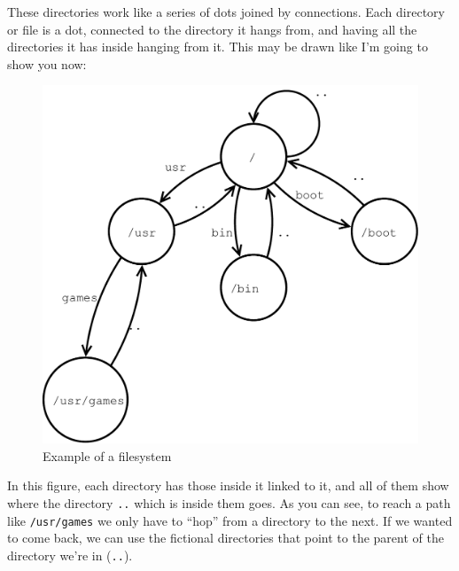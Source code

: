 \documentclass[a4paper]{article}
\begin{document}
These directories work like a series of dots joined by connections. Each
directory or file is a dot, connected to the directory it hangs from, and
having all the directories it has inside hanging from it. This may be drawn
like I'm going to show you now:

\begin{figure}[H]
    \includegraphics[width=\linewidth]{filesystems}
    \caption{Example of a filesystem}
    \label{img:extensions}
\end{figure}

In this figure, each directory has those inside it linked to it, and all of them
show where the directory \verb!..! which is inside them goes. As you can see, to
reach a path like \verb!/usr/games! we only have to ``hop'' from a directory to
the next. If we wanted to come back, we can use the fictional directories that
point to the parent of the directory we're in (\verb!..!).
\end{document}
